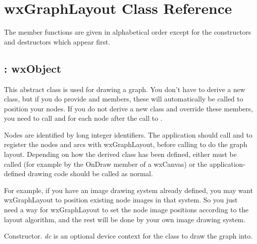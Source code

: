 \chapter{wxGraphLayout Class Reference}
%
\setfooter{\thepage}{}{}{}{}{\thepage}

The member functions are given in alphabetical order except for the
constructors and destructors which appear first.

\section{: wxObject}

This abstract class is used for drawing a graph. You don't have to derive
a new class, but if you do provide  and  members, these
will automatically be called to position your nodes. If you do not derive
a new class and override these members, you need to call \rtfsp
and  for each node after the call to .

Nodes are identified by long integer identifiers. The application should
call  and  to register
the nodes and arcs with wxGraphLayout, before calling
\rtfsp{} to do the graph layout. Depending on how
the derived class has been defined, either
\rtfsp{} must be called (for example
by the OnDraw member of a wxCanvas) or the application-defined drawing
code should be called as normal.

For example, if you have an image drawing system already defined, you
may want wxGraphLayout to position existing node images in that system. So you
just need a way for wxGraphLayout to set the node image positions according to
the layout algorithm, and the rest will be done by your own image drawing
system.



Constructor. {\it dc} is an optional device context for the class
to draw the graph into.

\label{activatenode}


